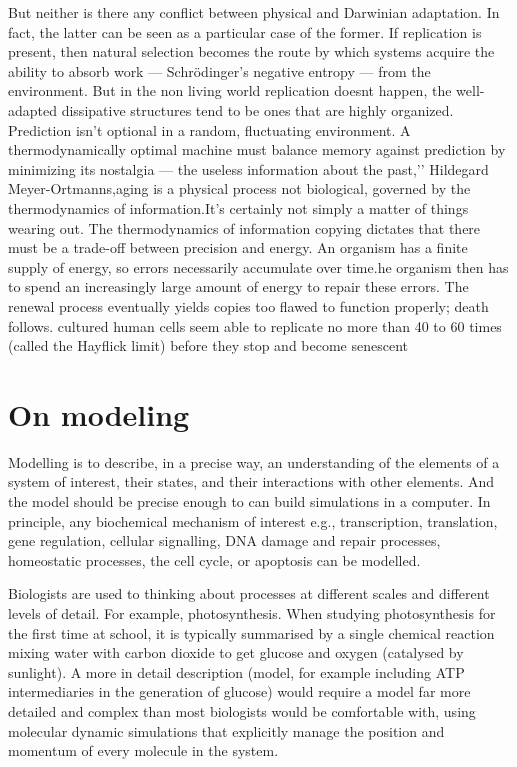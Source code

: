 \documentclass[onecollarge,runningheads]{svjour2}
\begin{document}
But neither is there any conflict between physical and Darwinian adaptation. In fact, the latter can be seen as a particular case of the former. If replication is present, then natural selection becomes the route by which systems acquire the ability to absorb work — Schrödinger’s negative entropy — from the environment. But in the non living world replication doesnt happen, the well-adapted dissipative structures tend to be ones that are highly organized.
Prediction isn’t optional in a random, fluctuating environment.
A thermodynamically optimal machine must balance memory against prediction by minimizing its nostalgia — the useless information about the past,’’
Hildegard Meyer-Ortmanns,aging is a physical process not biological, governed by the thermodynamics of information.It’s certainly not simply a matter of things wearing out.  The thermodynamics of information copying dictates that there must be a trade-off between precision and energy. An organism has a finite supply of energy, so errors necessarily accumulate over time.he organism then has to spend an increasingly large amount of energy to repair these errors. The renewal process eventually yields copies too flawed to function properly; death follows.
cultured human cells seem able to replicate no more than 40 to 60 times (called the Hayflick limit) before they stop and become senescent

\section{On modeling}
\citep{wilkinson2011stochastic} Modelling is to describe, in a precise way, an understanding of the elements of a system of interest, their states, and their interactions with other elements. And the model should be precise enough to can build simulations in a computer. In principle, any biochemical mechanism of interest e.g., transcription, translation, gene regulation, cellular signalling, DNA damage and repair processes, homeostatic processes, the cell cycle, or apoptosis can be modelled. 

Biologists are used to thinking about processes at different scales and different levels of detail. For example, photosynthesis. When studying photosynthesis for the first time at school, it is typically summarised by a single chemical reaction mixing water with carbon dioxide to get glucose and oxygen (catalysed by sunlight). A more in detail description (model, for example including ATP intermediaries in the generation of glucose) would require a model far more detailed and complex than most biologists would be comfortable with, using molecular dynamic simulations that explicitly manage the position and momentum of every molecule in the system.
\end{document}
